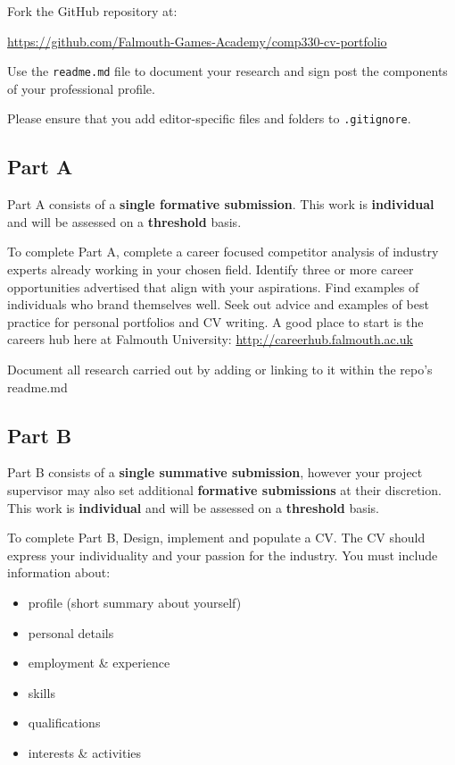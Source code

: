 \documentclass{../../fal_assignment}
\begin{document}
Fork the GitHub repository at:

\indent \url{https://github.com/Falmouth-Games-Academy/comp330-cv-portfolio }

Use the \texttt{readme.md} file to document your research and sign post the components of your professional profile. 

Please ensure that you add editor-specific files and folders to \texttt{.gitignore}. 


\subsection*{Part A}

Part A consists of a \textbf{single formative submission}.
This work is \textbf{individual} and will be assessed on a \textbf{threshold} basis.

To complete Part A, complete a career focused competitor analysis of industry experts already working in your chosen field. Identify three or more career opportunities advertised that align with your aspirations. Find examples of individuals who brand themselves well. Seek out advice and examples of best practice for personal portfolios and CV writing. A good place to start is the careers hub here at Falmouth University: \url{http://careerhub.falmouth.ac.uk} 

Document all research carried out by adding or linking to it within the repo's readme.md

\subsection*{Part B}
Part B consists of a \textbf{single summative submission},
however your project supervisor may also set additional \textbf{formative submissions} at their discretion.
This work is \textbf{individual} and will be assessed on a \textbf{threshold} basis.

To complete Part B, Design, implement and populate a CV. The CV should express your individuality and your passion for the industry. 
You must include information about: 

\begin{itemize}
	\item profile (short summary about yourself)
	\item personal details
	\item employment \& experience
	\item skills
	\item qualifications
	\item interests \& activities
\end{itemize}
\end{document}

